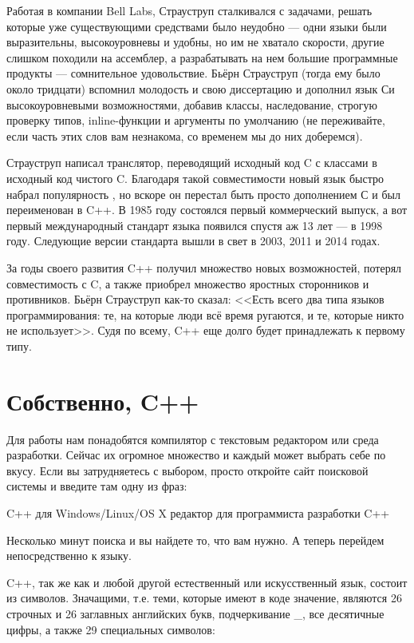 \documentclass{article}
\begin{document}
Работая в компании Bell Labs, Страуструп сталкивался с задачами, решать которые уже существующими средствами было неудобно --- одни языки были выразительны, высокоуровневы и удобны, но им не хватало скорости, другие слишком походили на ассемблер, а разрабатывать на нем большие программные продукты --- сомнительное удовольствие. Бьёрн Страуструп (тогда ему было около тридцати) вспомнил молодость и свою диссертацию и дополнил язык Си высокоуровневыми возможностями, добавив классы, наследование, строгую проверку типов, inline-функции и аргументы по умолчанию (не переживайте, если часть этих слов вам незнакома, со временем мы до них доберемся).

Страуструп написал транслятор, переводящий исходный код C с классами в исходный код чистого C. Благодаря такой совместимости новый язык быстро набрал популярность , но вскоре он перестал быть просто дополнением С и был переименован в C++. В 1985 году состоялся первый коммерческий выпуск, а вот первый международный стандарт языка появился спустя аж 13 лет --- в 1998 году. Следующие версии стандарта вышли в свет в 2003, 2011 и 2014 годах.

За годы своего развития C++ получил множество новых возможностей, потерял совместимость с C, а также приобрел множество яростных сторонников и противников. Бьёрн Страуструп как-то сказал: <<Есть всего два типа языков программирования: те, на которые люди всё время ругаются, и те, которые никто не использует>>. Судя по всему, C++ еще долго будет принадлежать к первому типу.

\section*{Собственно, C++}

Для работы нам понадобятся компилятор с текстовым редактором или среда разработки. Сейчас их огромное множество и каждый может выбрать себе по вкусу. Если вы затрудняетесь с выбором, просто откройте сайт поисковой системы и введите там одну из фраз:

\begin{itemize}
 C++ для Windows/Linux/OS X
 редактор для программиста
 разработки C++
\end{itemize}

Несколько минут поиска и вы найдете то, что вам нужно. А теперь перейдем непосредственно к языку.

C++, так же как и любой другой естественный или искусственный язык, состоит из символов. Значащими, т.е. теми, которые имеют в коде значение, являются 26 строчных и 26 заглавных английских букв, подчеркивание \_, все десятичные цифры, а также 29 специальных символов: 
\end{document}
